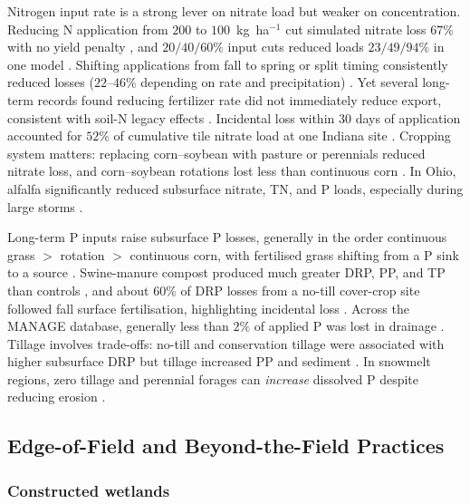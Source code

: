 Nitrogen input rate is a strong lever on nitrate load but weaker on
concentration. Reducing N application from $200$ to $100$~kg~ha$^{-1}$ cut
simulated nitrate loss $67\%$ with no yield penalty \parencite{Moriasi2013},
and $20/40/60\%$ input cuts reduced loads $23/49/94\%$ in one model
\parencite{Chaplot2004}. Shifting applications from fall to spring or split
timing consistently reduced losses ($22$--$46\%$ depending on rate and
precipitation) \parencite{Wilson2020,Gowda2007,Nangia2010,Singh2020b}. Yet
several long-term records found reducing fertilizer rate did not immediately
reduce export, consistent with soil-N legacy effects
\parencite{Kelley2017,Cambardella1999,Siksnane2017}. Incidental loss within
$30$ days of application accounted for $52\%$ of cumulative tile nitrate load
at one Indiana site \parencite{Williams2022}. Cropping system matters:
replacing corn--soybean with pasture or perennials reduced nitrate loss, and
corn--soybean rotations lost less than continuous corn
\parencite{Chaplot2004,Ni2020,Arrueta2022}. In Ohio, alfalfa significantly
reduced subsurface nitrate, TN, and P loads, especially during large storms
\parencite{Arrueta2022,Arrueta2025}.

Long-term P inputs raise subsurface P losses, generally in the order
continuous grass $>$ rotation $>$ continuous corn, with fertilised grass
shifting from a P sink to a source \parencite{Zhang2015b}. Swine-manure
compost produced much greater DRP, PP, and TP than controls
\parencite{Zhang2015}, and about $60\%$ of DRP losses from a no-till
cover-crop site followed fall surface fertilisation, highlighting incidental
loss \parencite{Macrae2023,Mumbi2025b}. Across the MANAGE database, generally
less than $2\%$ of applied P was lost in drainage \parencite{Christianson2016}.
Tillage involves trade-offs: no-till and conservation tillage were associated
with higher subsurface DRP but tillage increased PP and sediment
\parencite{Ni2020,Macrae2023,Koskiaho2002}. In snowmelt regions, zero tillage
and perennial forages can \emph{increase} dissolved P despite reducing erosion
\parencite{Baulch2019}.

\subsection{Edge-of-Field and Beyond-the-Field Practices}

\subsubsection{Constructed wetlands}

